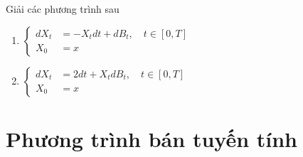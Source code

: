\begin{exam*}
    Giải các phương trình sau
    \begin{enumerate}
        \item 
        $\begin{cases}
            dX_t &= -X_tdt + dB_t, \quad t\in [0,T] \\
            X_0 &=  x
         \end{cases}$
        \item 
        $\begin{cases}
            dX_t &= 2dt + X_tdB_t, \quad t\in [0,T] \\
            X_0 &=  x
        \end{cases}$
    \end{enumerate}
\end{exam*}
\begin{sol*}
    
\end{sol*}
\section{Phương trình bán tuyến tính}
